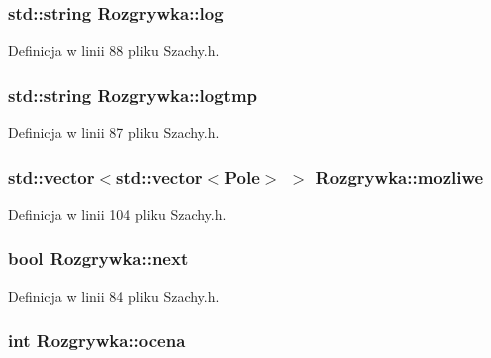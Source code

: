 \hypertarget{class_rozgrywka_a5ab94cafc14381b9f8da8a1ddb428f55}{
\subsubsection[{log}]{\setlength{\rightskip}{0pt plus 5cm}std\-::string {\bf \-Rozgrywka\-::log}}}\label{class_rozgrywka_a5ab94cafc14381b9f8da8a1ddb428f55}


\-Definicja w linii 88 pliku \-Szachy.\-h.

\hypertarget{class_rozgrywka_a2b399aa340778eab619f889c7efed08d}{
\subsubsection[{logtmp}]{\setlength{\rightskip}{0pt plus 5cm}std\-::string {\bf \-Rozgrywka\-::logtmp}}}\label{class_rozgrywka_a2b399aa340778eab619f889c7efed08d}


\-Definicja w linii 87 pliku \-Szachy.\-h.

\hypertarget{class_rozgrywka_a54acd39dc475453661bcf7b8c51b5047}{
\subsubsection[{mozliwe}]{\setlength{\rightskip}{0pt plus 5cm}std\-::vector$<$std\-::vector$<${\bf \-Pole}$>$ $>$ {\bf \-Rozgrywka\-::mozliwe}}}\label{class_rozgrywka_a54acd39dc475453661bcf7b8c51b5047}


\-Definicja w linii 104 pliku \-Szachy.\-h.

\hypertarget{class_rozgrywka_a792971709bdb3b8e29b081e7bcf18cc9}{
\subsubsection[{next}]{\setlength{\rightskip}{0pt plus 5cm}bool {\bf \-Rozgrywka\-::next}}}\label{class_rozgrywka_a792971709bdb3b8e29b081e7bcf18cc9}


\-Definicja w linii 84 pliku \-Szachy.\-h.

\hypertarget{class_rozgrywka_a066b0f6ea58752342f0b4bf94a2e54ce}{
\subsubsection[{ocena}]{\setlength{\rightskip}{0pt plus 5cm}int {\bf \-Rozgrywka\-::ocena}}}\label{class_rozgrywka_a066b0f6ea58752342f0b4bf94a2e54ce}



